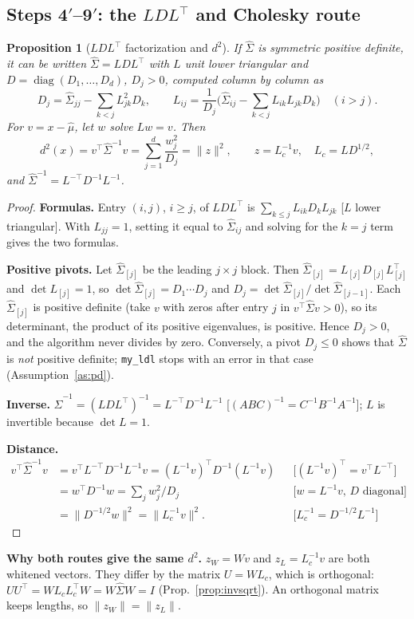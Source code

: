 \documentclass[11pt]{article}
\newtheorem{proposition}[theorem]{Proposition}
\theoremstyle{definition}
\newcommand{\T}{^{\top}}
\newcommand{\diag}{\operatorname{diag}}
\newcommand{\rul}[1]{\text{[#1]}}
\begin{document}
\subsection{Steps 4$'$--9$'$: the $LDL\T$ and Cholesky route}
\begin{proposition}[$LDL\T$ factorization and $d^2$]\label{prop:ldl}
If $\hat\Sigma$ is symmetric positive definite, it can be written $\hat\Sigma=LDL\T$ with $L$ unit lower triangular and $D=\diag(D_1,\dots,D_d)$, $D_j>0$, computed column by column as
\[
D_j=\hat\Sigma_{jj}-\sum_{k<j}L_{jk}^2D_k,\qquad L_{ij}=\frac{1}{D_j}\Big(\hat\Sigma_{ij}-\sum_{k<j}L_{ik}L_{jk}D_k\Big)\quad(i>j).
\]
For $v=x-\hat\mu$, let $w$ solve $Lw=v$. Then
\[
d^2(x)=v\T\hat\Sigma^{-1}v=\sum_{j=1}^d\frac{w_j^2}{D_j}=\|z\|^2,\qquad z=L_c^{-1}v,\quad L_c=LD^{1/2},
\]
and $\hat\Sigma^{-1}=L^{-\top}D^{-1}L^{-1}$.
\end{proposition}
\begin{proof}
\textbf{Formulas.} Entry $(i,j)$, $i\ge j$, of $LDL\T$ is $\sum_{k\le j}L_{ik}D_kL_{jk}$ [$L$ lower triangular]. With $L_{jj}=1$, setting it equal to $\hat\Sigma_{ij}$ and solving for the $k=j$ term gives the two formulas.

\textbf{Positive pivots.} Let $\hat\Sigma_{[j]}$ be the leading $j\times j$ block. Then $\hat\Sigma_{[j]}=L_{[j]}D_{[j]}L_{[j]}\T$ and $\det L_{[j]}=1$, so $\det\hat\Sigma_{[j]}=D_1\cdots D_j$ and $D_j=\det\hat\Sigma_{[j]}/\det\hat\Sigma_{[j-1]}$. Each $\hat\Sigma_{[j]}$ is positive definite (take $v$ with zeros after entry $j$ in $v\T\hat\Sigma v>0$), so its determinant, the product of its positive eigenvalues, is positive. Hence $D_j>0$, and the algorithm never divides by zero. Conversely, a pivot $D_j\le0$ shows that $\hat\Sigma$ is \emph{not} positive definite; \texttt{my\_ldl} stops with an error in that case (Assumption~\ref{as:pd}).

\textbf{Inverse.} $\hat\Sigma^{-1}=(LDL\T)^{-1}=L^{-\top}D^{-1}L^{-1}$ [$(ABC)^{-1}=C^{-1}B^{-1}A^{-1}$]; $L$ is invertible because $\det L=1$.

\textbf{Distance.}
\begin{align*}
v\T\hat\Sigma^{-1}v &= v\T L^{-\top}D^{-1}L^{-1}v=(L^{-1}v)\T D^{-1}(L^{-1}v) && \rul{$(L^{-1}v)\T=v\T L^{-\top}$}\\
&= w\T D^{-1}w=\sum_j w_j^2/D_j && \rul{$w=L^{-1}v$, $D$ diagonal}\\
&= \|D^{-1/2}w\|^2=\|L_c^{-1}v\|^2. && \rul{$L_c^{-1}=D^{-1/2}L^{-1}$}
\end{align*}
\end{proof}
\noindent\textbf{Why both routes give the same $d^2$.} $z_W=Wv$ and $z_L=L_c^{-1}v$ are both whitened vectors. They differ by the matrix $U=WL_c$, which is orthogonal: $UU\T=WL_cL_c\T W=W\hat\Sigma W=I$ (Prop.~\ref{prop:invsqrt}). An orthogonal matrix keeps lengths, so $\|z_W\|=\|z_L\|$.
\end{document}
